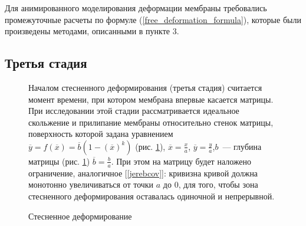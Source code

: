 	
	Для анимированного моделирования деформации мембраны требовались промежуточные
	расчеты по формуле (\ref{free_deformation_formula}), которые были произведены методами, описанными в пункте 3.
	\newpage
	\subsection{Третья стадия}
	\begin{figure}[h!]
		\begin{minipage}[h]{0.48\linewidth}
			
			\def\svgwidth{\columnwidth}
			\caption{ Стесненное деформирование }
				\label{quad_matrix_pic}
		\end{minipage}
		\hfill
		\begin{minipage}[h]{0.48\linewidth}	
Началом стесненного деформирования (третья стадия) считается момент времени, при котором мембрана впервые касается матрицы. При исследовании этой стадии рассматривается идеальное скольжение и прилипание мембраны относительно стенок матрицы,  поверхность которой задана уравнением $\overline{y} = f(\overline{x}) = \overline{b}(1-(\overline{x})^k)$ (рис. \ref{quad_matrix_pic}), $\overline{x} = \frac x a$, $\overline{y} = \frac y a$,$b$~--- глубина матрицы (рис. \ref{quad_matrix_pic}) $\overline{b} = \frac b a$. При этом на матрицу будет наложено ограничение, аналогичное 
[\ref{jerebcov}]: кривизна кривой должна монотонно увеличиваться от точки $a$ до $0$, для того, чтобы зона стесненного деформирования оставалась одиночной и непрерывной.
	
		\end{minipage}

	\end{figure}
	
